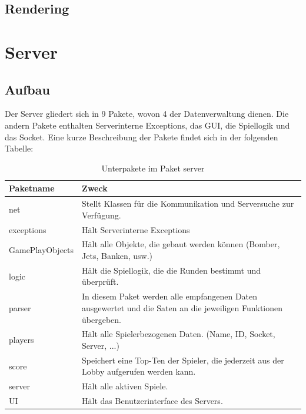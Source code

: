 \documentclass[ngerman, 12pt, pdftex]{scrartcl}[2006/07/30]
\begin{document}
\subsection{Rendering}


\section{Server}
\subsection{Aufbau}
Der Server gliedert sich in 9 Pakete, wovon 4 der Datenverwaltung dienen. Die andern Pakete enthalten Serverinterne Exceptions, das GUI, die Spiellogik und das Socket.
Eine kurze Beschreibung der Pakete findet sich in der folgenden Tabelle:
\begin{table}[h!]
\begin{tabular}{ l p{11.5cm} }
  Paketname & Zweck \\ \hline
  
  net &  
  Stellt Klassen für die Kommunikation und Serversuche zur Verfügung. \\
  
  exceptions & 
  Hält Serverinterne Exceptions\\
  
  GamePlayObjects &
  Hält alle Objekte, die gebaut werden können (Bomber, Jets, Banken, usw.)\\
  
  logic &
  Hält die Spiellogik, die die Runden bestimmt und überprüft.\\
  
  parser &
  In diesem Paket werden alle empfangenen Daten ausgewertet und die Saten an die jeweiligen Funktionen übergeben.\\
  
  players &
  Hält alle Spielerbezogenen Daten. (Name, ID, Socket, Server, ...)\\
  
  score &
  Speichert eine Top-Ten der Spieler, die jederzeit aus der Lobby aufgerufen werden kann.\\
  
  server &
  Hält alle aktiven Spiele.\\
  
  UI &
  Hält das Benutzerinterface des Servers.\\
  
 
\end{tabular}
\caption{Unterpakete im Paket server}
\end{table}
\end{document}

